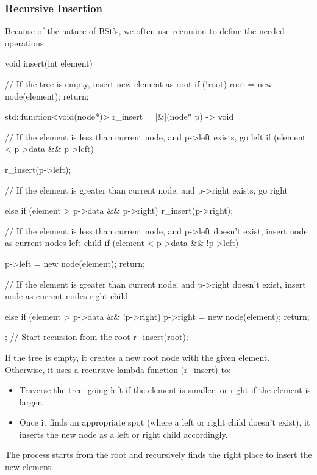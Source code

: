 \documentclass{report}
\begin{document}
\subsubsection{Recursive Insertion}
\bigbreak \noindent 
Because of the nature of  BSt's, we often use recursion to define the needed operations.
\bigbreak \noindent 
\begin{cppcode}
    void insert(int element)  {
        // If the tree is empty, insert new element as root
        if (!root) {
            root = new node(element);
            return;
        }

        std::function<void(node*)> r_insert = [&](node* p) -> void {

            // If the element is less than current node, and p->left exists, go left
            if (element < p->data && p->left) {
                r_insert(p->left);

                // If the element is greater than current node, and p->right exists, go right
            } else if (element > p->data && p->right) {
                r_insert(p->right);
            }

            // If the element is less than current node, and p->left doesn't exist, insert node as current nodes left child
            if (element < p->data && !p->left) {
                p->left = new node(element);
                return;

                // If the element is greater than current node, and p->right doesn't exist, insert node as current nodes right child
            } else if (element > p->data && !p->right) {
                p->right = new node(element);
                return;
            }
        };
        // Start recursion from the root
        r_insert(root);
    }
\end{cppcode}
\bigbreak \noindent 
If the tree is empty, it creates a new root node with the given element.
\bigbreak \noindent 
Otherwise, it uses a recursive lambda function (r\_insert) to:
\begin{itemize}
    \item Traverse the tree: going left if the element is smaller, or right if the element is larger.
    \item Once it finds an appropriate spot (where a left or right child doesn't exist), it inserts the new node as a left or right child accordingly.
\end{itemize}
The process starts from the root and recursively finds the right place to insert the new element.
\end{document}
